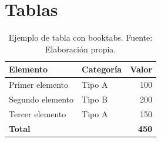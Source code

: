 


\section{Tablas}
\label{sec:tablas}

%
%

\begin{table}[htbp]
\centering
\begin{tabular}{@{}llr@{}}
\toprule
\textbf{Elemento} & \textbf{Categoría} & \textbf{Valor} \\ \midrule
Primer elemento    & Tipo A             & 100             \\
Segundo elemento   & Tipo B             & 200             \\
Tercer elemento    & Tipo A             & 150             \\ \midrule
\textbf{Total}     &                    & \textbf{450}    \\ \bottomrule
\end{tabular}
\caption{Ejemplo de tabla con booktabs. Fuente: Elaboración propia.}
\label{tab:ejemplo}
\end{table}



